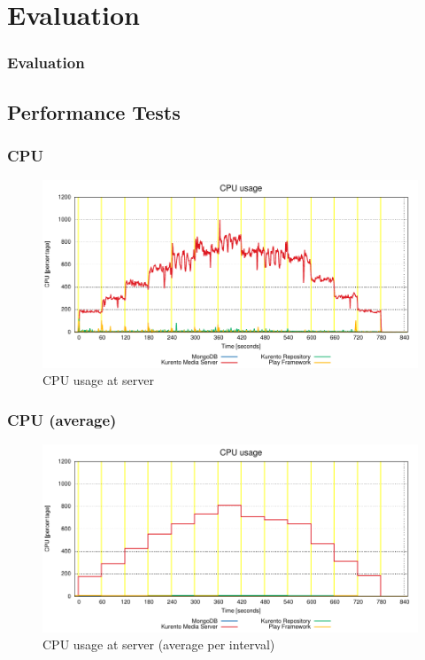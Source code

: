 \documentclass[compress]{beamer}
\begin{document}
\section{Evaluation}\label{arch}

\begin{frame}[t,shrink]
\frametitle{Evaluation} 
\end{frame}

\subsection{Performance Tests}

	\begin{frame}[c]
		\frametitle{CPU}
		\begin{figure}[H]
			\includegraphics[width=\textwidth]{figures/cpu.pdf}
			\caption{CPU usage at server}
		\end{figure}
	\end{frame}
	\begin{frame}[c]
		\frametitle{CPU (average)}
		\begin{figure}[H]
			\includegraphics[width=\textwidth]{figures/cpu_avg.pdf}
			\caption{CPU usage at server (average per interval)}
		\end{figure}
	\end{frame}
\end{document}
